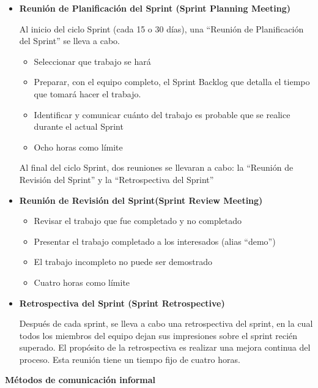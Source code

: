 \begin{itemize}
	\item \textbf{ Reunión de Planificación del Sprint (Sprint Planning Meeting)}

Al inicio del ciclo Sprint (cada 15 o 30 días), una “Reunión de Planificación del Sprint” se lleva a cabo.
	\begin{itemize}
	    \item Seleccionar que trabajo se hará
		\item    Preparar, con el equipo completo, el Sprint Backlog que detalla el tiempo que tomará hacer el trabajo.
		\item    Identificar y comunicar cuánto del trabajo es probable que se realice durante el actual Sprint
		\item    Ocho horas como límite
	\end{itemize}
Al final del ciclo Sprint, dos reuniones se llevaran a cabo: la “Reunión de Revisión del Sprint” y la “Retrospectiva del Sprint”
	\item \textbf{Reunión de Revisión del Sprint(Sprint Review Meeting)}
		\begin{itemize}
			\item    Revisar el trabajo que fue completado y no completado
			\item    Presentar el trabajo completado a los interesados (alias “demo”)
			\item    El trabajo incompleto no puede ser demostrado
			\item    Cuatro horas como límite
		\end{itemize}

	\item \textbf{Retrospectiva del Sprint (Sprint Retrospective)}

Después de cada sprint, se lleva a cabo una retrospectiva del sprint, en la cual todos los miembros del equipo dejan sus impresiones sobre el sprint recién superado. El propósito de la retrospectiva es realizar una mejora continua del proceso. Esta reunión tiene un tiempo fijo de cuatro horas.

	\end{itemize}

\textbf{Métodos de comunicación informal}


